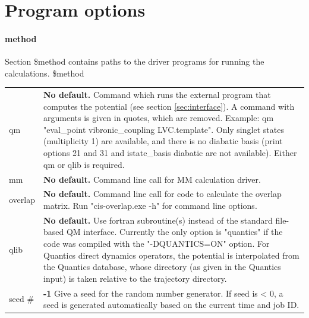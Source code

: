 \documentclass{report}
\begin{document}
\section*{Program options} \label{sec:options}
\paragraph{method}
Section \$method contains paths to the driver programs for running the calculations.  \newline
\$method

\begin{tabularx}{\textwidth}{ m{2.5cm} X }
qm				&
	\textbf{No default.} \newline
	Command which runs the external program that computes the potential (see section \ref{sec:interface}). A command with arguments is given in quotes, which are removed. Example: qm "eval\_point vibronic\_coupling LVC.template". Only singlet states (multiplicity 1) are available, and there is no diabatic basis (print options 21 and 31 and istate\_basis diabatic are not available). Either qm or qlib is required.  \\

mm				&
	\textbf{No default.} \newline
	Command line call for MM calculation driver.  \\

overlap &
    	\textbf{No default.} \newline
	Command line call for code to calculate the overlap matrix. Run "cis-overlap.exe -h" for command line options. \\

qlib &
    \textbf{No default.} \newline
    Use fortran subroutine(s) instead of the standard file-based QM interface. Currently the only option is "quantics" if the code
    was compiled with the "-DQUANTICS=ON" option. For Quantics direct dynamics operators, the potential is interpolated from the
    Quantics database, whose directory (as given in the Quantics input) is taken relative to the trajectory directory. \\

seed \# &
	\textbf{-1} \newline
	Give a seed for the random number generator. If seed is < 0, a seed is generated automatically based on the current time and job ID. \\
\end{tabularx}
\end{document}
